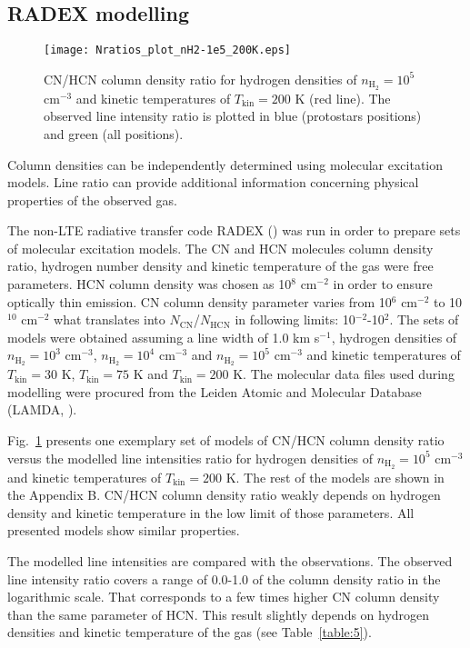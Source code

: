 \documentclass{aa}
\begin{document}
\subsection{RADEX modelling}

\begin{figure}
   \centering
   \texttt{[image: Nratios\_plot\_nH2-1e5\_200K.eps]}
      \caption{CN/HCN column density ratio for hydrogen densities of $n_\mathrm{H_2} = 10^5$ cm$^{-3}$ and kinetic temperatures of $T_\mathrm{kin} = 200$ K (red line). The observed line intensity ratio is plotted in blue (protostars positions) and green (all positions).}
         \label{1e5_75K}
\end{figure}

Column densities can be independently determined using molecular excitation models. Line ratio can provide additional information concerning physical properties of the observed gas. 

The non-LTE radiative transfer code RADEX (\citealt{vdT07}) was run in order to prepare sets of molecular excitation models. The CN and HCN molecules column density ratio, hydrogen number density and kinetic temperature of the gas were free parameters. HCN column density was chosen as 10$^8$ cm$^{-2}$ in order to ensure optically thin emission. CN column density parameter varies from 10$^6$ cm$^{-2}$ to 10$^{10}$ cm$^{-2}$ what translates into $N_\mathrm{CN}$/$N_\mathrm{HCN}$ in following limits: 10$^{-2}$-10$^{2}$. The sets of models were obtained assuming a line width of 1.0 km s$^{-1}$, hydrogen densities of $n_\mathrm{H_2} = 10^3$ cm$^{-3}$, $n_\mathrm{H_2} = 10^4$ cm$^{-3}$ and $n_\mathrm{H_2} = 10^5$ cm$^{-3}$ and kinetic temperatures of $T_\mathrm{kin} = 30$ K, $T_\mathrm{kin} = 75$ K and $T_\mathrm{kin} =200$ K. The molecular data files used during modelling were procured from the Leiden Atomic and Molecular Database (LAMDA, \citealt{Sch05}).

Fig.~\ref{1e5_75K} presents one exemplary set of models of CN/HCN column density ratio versus the modelled line intensities ratio for hydrogen densities of $n_\mathrm{H_2} = 10^5$ cm$^{-3}$ and kinetic temperatures of $T_\mathrm{kin} = 200$ K. The rest of the models are shown in the Appendix B. CN/HCN column density ratio weakly depends on hydrogen density and kinetic temperature in the low limit of those parameters. All presented models show similar properties.

The modelled line intensities are compared with the observations. The observed line intensity ratio covers a range of \mbox{0.0-1.0} of the column density ratio in the logarithmic scale. That corresponds to a few times higher CN column density than the same parameter of HCN. This result slightly depends on hydrogen densities and kinetic temperature of the gas (see Table~\ref{table:5}).
\end{document}
